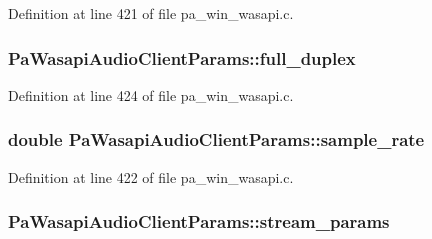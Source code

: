 Definition at line 421 of file pa\+\_\+win\+\_\+wasapi.\+c.

\subsubsection[{\texorpdfstring{full\+\_\+duplex}{full_duplex}}]{ Pa\+Wasapi\+Audio\+Client\+Params\+::full\+\_\+duplex}\hypertarget{struct_pa_wasapi_audio_client_params_ac94ccf5cb33748fb1c5ad1f040ccc178}{}\label{struct_pa_wasapi_audio_client_params_ac94ccf5cb33748fb1c5ad1f040ccc178}


Definition at line 424 of file pa\+\_\+win\+\_\+wasapi.\+c.

\subsubsection[{\texorpdfstring{sample\+\_\+rate}{sample_rate}}]{\setlength{\rightskip}{0pt plus 5cm}double Pa\+Wasapi\+Audio\+Client\+Params\+::sample\+\_\+rate}\hypertarget{struct_pa_wasapi_audio_client_params_aaf327b0ecb554eb9d8b331d647c000b6}{}\label{struct_pa_wasapi_audio_client_params_aaf327b0ecb554eb9d8b331d647c000b6}


Definition at line 422 of file pa\+\_\+win\+\_\+wasapi.\+c.

\subsubsection[{\texorpdfstring{stream\+\_\+params}{stream_params}}]{ Pa\+Wasapi\+Audio\+Client\+Params\+::stream\+\_\+params}\hypertarget{struct_pa_wasapi_audio_client_params_ac01b82e3992a001815a26eeb5a225e8a}{}\label{struct_pa_wasapi_audio_client_params_ac01b82e3992a001815a26eeb5a225e8a}


